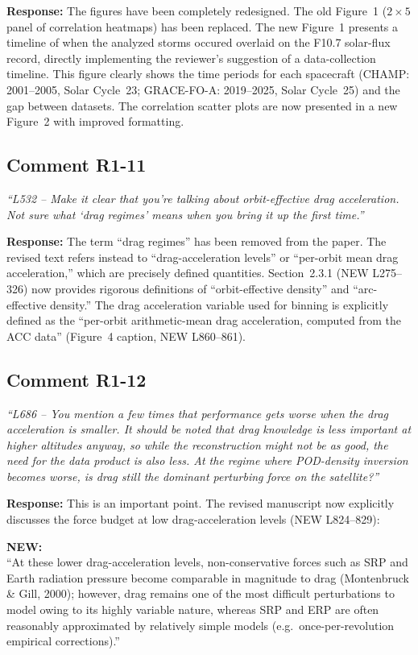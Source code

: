 \documentclass[11pt]{article}
\newcommand{\reviewercomment}[1]{%
  \medskip
  \noindent\textit{\color{reviewblue}#1}%
  \medskip
}
\newcommand{\newtext}[1]{%
  \smallskip
  \noindent\hspace{1em}\begin{minipage}{0.92\textwidth}%
  \color{quotegreen}\textbf{NEW:}\\[2pt]``#1''%
  \end{minipage}%
  \smallskip
}
\begin{document}
\textbf{Response:}
The figures have been completely redesigned. The old Figure~1 ($2\times5$ panel of correlation heatmaps) has been replaced. The new Figure~1 presents a timeline of when the analyzed storms occured overlaid on the F10.7 solar-flux record, directly implementing the reviewer's suggestion of a data-collection timeline. This figure clearly shows the time periods for each spacecraft (CHAMP: 2001--2005, Solar Cycle~23; GRACE-FO-A: 2019--2025, Solar Cycle~25) and the gap between datasets. The correlation scatter plots are now presented in a new Figure~2 with improved formatting.


\subsection{Comment R1-11}

\reviewercomment{%
``L532 -- Make it clear that you're talking about orbit-effective drag acceleration. Not sure what `drag regimes' means when you bring it up the first time.''}

\textbf{Response:}
The term ``drag regimes'' has been removed from the paper. The revised text refers instead to ``drag-acceleration levels'' or ``per-orbit mean drag acceleration,'' which are precisely defined quantities. Section~2.3.1 (NEW L275--326) now provides rigorous definitions of ``orbit-effective density'' and ``arc-effective density.'' The drag acceleration variable used for binning is explicitly defined as the ``per-orbit arithmetic-mean drag acceleration, computed from the ACC data'' (Figure~4 caption, NEW L860--861).


\subsection{Comment R1-12}

\reviewercomment{%
``L686 -- You mention a few times that performance gets worse when the drag acceleration is smaller. It should be noted that drag knowledge is less important at higher altitudes anyway, so while the reconstruction might not be as good, the need for the data product is also less. At the regime where POD-density inversion becomes worse, is drag still the dominant perturbing force on the satellite?''}

\textbf{Response:}
This is an important point. The revised manuscript now explicitly discusses the force budget at low drag-acceleration levels (NEW L824--829):

\newtext{At these lower drag-acceleration levels, non-conservative forces such as SRP and Earth radiation pressure become comparable in magnitude to drag (Montenbruck \& Gill, 2000); however, drag remains one of the most difficult perturbations to model owing to its highly variable nature, whereas SRP and ERP are often reasonably approximated by relatively simple models (e.g.\ once-per-revolution empirical corrections).}
\end{document}
